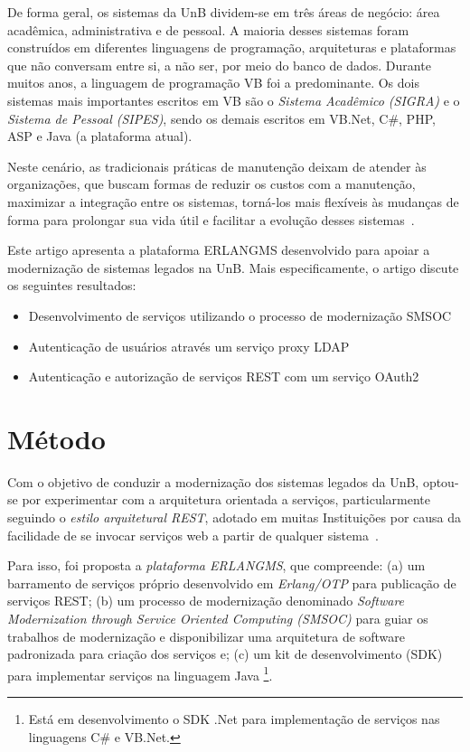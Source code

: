 \documentclass[12pt]{article}
\begin{document}
De forma geral, os sistemas da UnB dividem-se em
três áreas de negócio: área acadêmica, administrativa e de pessoal.
A maioria desses sistemas foram construídos em diferentes linguagens de programação,
arquiteturas e plataformas que não conversam entre
si, a não ser, por meio do banco de dados. Durante muitos anos,
a linguagem de programação VB foi a predominante. Os dois sistemas mais
importantes escritos em VB são o \emph{Sistema Acadêmico (SIGRA)} e
o \emph{Sistema de Pessoal (SIPES)}, sendo os demais escritos
em VB.Net, C\#, PHP, ASP e Java (a plataforma atual). 

Neste cenário, as tradicionais práticas de manutenção deixam 
de atender \`{a}s organizações, que buscam formas de reduzir 
os custos com a manutenção, maximizar a integração entre os sistemas,
torná-los mais flexíveis às mudanças de forma para prolongar sua vida útil e facilitar a evolução
desses sistemas~\cite{S3_Bisbal:1999}. 


Este artigo apresenta a plataforma ERLANGMS desenvolvido 
para apoiar a modernização de sistemas legados na UnB. Mais
especificamente, o artigo discute os seguintes resultados:

\begin{itemize}

\item Desenvolvimento de serviços utilizando o processo de modernização SMSOC

\item Autenticação de usuários através um serviço proxy LDAP

\item Autenticação e autorização de serviços REST com um serviço OAuth2

\end{itemize} 


\section{Método}


Com o objetivo de conduzir a modernização dos sistemas legados da UnB,
optou-se por experimentar com a arquitetura orientada a servi\c cos, particularmente 
seguindo o \emph{estilo arquitetural REST}, adotado 
em muitas Instituições por causa
da facilidade de se invocar serviços 
web a partir de qualquer sistema~\cite{fielding2000architectural}. 

Para isso, foi proposta a \emph{plataforma ERLANGMS}, 
que compreende: (a) um barramento de serviços próprio 
desenvolvido em \emph{Erlang/OTP} para publicação de serviços REST;
(b) um processo de modernização
denominado \emph{Software Modernization through Service Oriented Computing (SMSOC)} 
para guiar os trabalhos de modernização e disponibilizar uma arquitetura de 
software padronizada para criação dos serviços e;
(c) um kit de desenvolvimento (SDK) para implementar serviços na linguagem Java
\footnote{Está em desenvolvimento o SDK .Net para implementação de serviços nas linguagens C\# e VB.Net.}.
\end{document}
